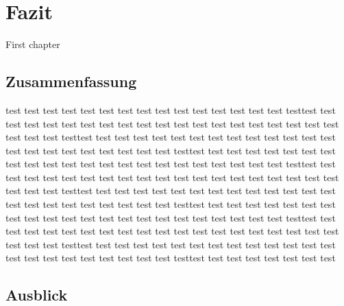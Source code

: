 %
% 

\chapter{Fazit}

First chapter


\section{Zusammenfassung}
test test test test test test test test test test test test test test test testtest test test test test test test test
test test test test test test test test test test test test test test test testtest test test test test test test test
test test test test test test test test test test test test test test test testtest test test test test test test test
test test test test test test test test test test test test test test test testtest test test test test test test test
test test test test test test test test test test test test test test test testtest test test test test test test test
test test test test test test test test test test test test test test test testtest test test test test test test test
test test test test test test test test test test test test test test test testtest test test test test test test test
test test test test test test test test test test test test test test test testtest test test test test test test test
test test test test test test test test test test test test test test test testtest test test test test test test test

\section{Ausblick}

